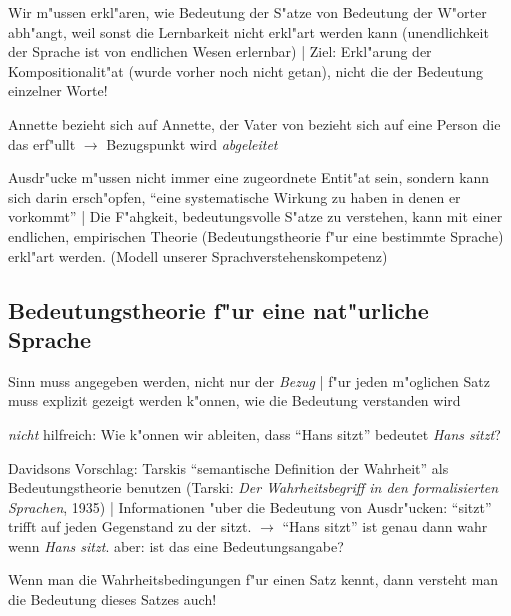 \documentclass[emulatestandardclasses]{scrartcl}
\begin{document}
\begin{description}[leftmargin=!,labelwidth=\widthof{\bfseries Ausgangspunkt}]
    \item[Ausgangspunkt] Wir m"ussen erkl"aren, wie Bedeutung der S"atze von Bedeutung der W"orter abh"angt, weil sonst die Lernbarkeit nicht erkl"art werden kann (unendlichkeit der Sprache ist von endlichen Wesen erlernbar) | Ziel: Erkl"arung der Kompositionalit"at (wurde vorher noch nicht getan), nicht die der Bedeutung einzelner Worte!
    \item[Modell] Annette bezieht sich auf Annette, der Vater von bezieht sich auf eine Person die das erf"ullt $\rightarrow$ Bezugspunkt wird \emph{abgeleitet}
    \item[Konsequenzen] Ausdr"ucke m"ussen nicht immer eine zugeordnete Entit"at sein, sondern kann sich darin ersch"opfen, "`eine systematische Wirkung zu haben in denen er vorkommt"' | Die F"ahgkeit, bedeutungsvolle S"atze zu verstehen, kann mit einer endlichen, empirischen Theorie (Bedeutungstheorie f"ur eine bestimmte Sprache) erkl"art werden. (Modell unserer Sprachverstehenskompetenz)
\end{description}

\subsection{Bedeutungstheorie f"ur eine nat"urliche Sprache}

\begin{description}[leftmargin=!,labelwidth=\widthof{\bfseries Herausforderungen}]
    \item[Herausforderungen] Sinn muss angegeben werden, nicht nur der \emph{Bezug} | f"ur jeden m"oglichen Satz muss explizit gezeigt werden k"onnen, wie die Bedeutung verstanden wird
    \item[Bedeutung] \emph{nicht} hilfreich: Wie k"onnen wir ableiten, dass "`Hans sitzt"' bedeutet \emph{Hans sitzt}?
    \item[Tarski] Davidsons Vorschlag: Tarskis "`semantische Definition der Wahrheit"' als Bedeutungstheorie benutzen (Tarski: \emph{Der Wahrheitsbegriff in den formalisierten Sprachen}, 1935) | Informationen "uber die Bedeutung von Ausdr"ucken: "`sitzt"' trifft auf jeden Gegenstand zu der sitzt. $\rightarrow$ "`Hans sitzt"' ist genau dann wahr wenn \emph{Hans sitzt}. aber: ist das eine Bedeutungsangabe?
    \item[Behauptung] Wenn man die Wahrheitsbedingungen f"ur einen Satz kennt, dann versteht man die Bedeutung dieses Satzes auch! 
\end{description}
\end{document}
